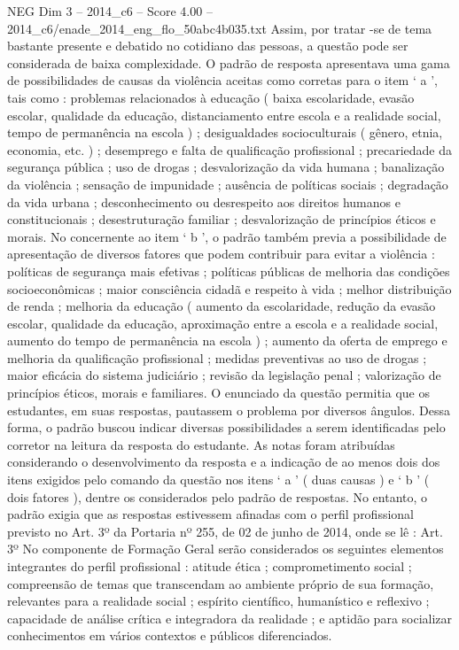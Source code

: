 \begin{textsample}{NEG Dim 3 – 2014\_c6 – Score 4.00 – 2014\_c6/enade\_2014\_eng\_flo\_50abc4b035.txt}
Assim, por tratar -se de tema bastante presente e debatido no cotidiano das pessoas, a questão pode ser considerada de baixa complexidade.
O padrão de resposta apresentava uma gama de possibilidades de causas da violência aceitas como corretas para o item ‘ a ’, tais como : problemas relacionados à educação ( baixa escolaridade, evasão escolar, qualidade da educação, distanciamento entre escola e a realidade social, tempo de permanência na escola ) ; desigualdades socioculturais ( gênero, etnia, economia, etc. ) ; desemprego e falta de qualificação profissional ; precariedade da segurança pública ; uso de drogas ; desvalorização da vida humana ; banalização da violência ; sensação de impunidade ; ausência de políticas sociais ; degradação da vida urbana ; desconhecimento ou desrespeito aos direitos humanos e constitucionais ; desestruturação familiar ; desvalorização de princípios éticos e morais.
No concernente ao item ‘ b ’, o padrão também previa a possibilidade de apresentação de diversos fatores que podem contribuir para evitar a violência : políticas de segurança mais efetivas ; políticas públicas de melhoria das condições socioeconômicas ; maior consciência cidadã e respeito à vida ; melhor distribuição de renda ; melhoria da educação ( aumento da escolaridade, redução da evasão escolar, qualidade da educação, aproximação entre a escola e a realidade social, aumento do tempo de permanência na escola ) ; aumento da oferta de emprego e melhoria da qualificação profissional ; medidas preventivas ao uso de drogas ; maior eficácia do sistema judiciário ; revisão da legislação penal ; valorização de princípios éticos, morais e familiares.
O enunciado da questão permitia que os estudantes, em suas respostas, pautassem o problema por diversos ângulos.
Dessa forma, o padrão buscou indicar diversas possibilidades a serem identificadas pelo corretor na leitura da resposta do estudante.
As notas foram atribuídas considerando o desenvolvimento da resposta e a indicação de ao menos dois dos itens exigidos pelo comando da questão nos itens ‘ a ’ ( duas causas ) e ‘ b ’ ( dois fatores ), dentre os considerados pelo padrão de respostas.
No entanto, o padrão exigia que as respostas estivessem afinadas com o perfil profissional previsto no Art. 3º da Portaria nº 255, de 02 de junho de 2014, onde se lê : Art. 3º No componente de Formação Geral serão considerados os seguintes elementos integrantes do perfil profissional : atitude ética ; comprometimento social ; compreensão de temas que transcendam ao ambiente próprio de sua formação, relevantes para a realidade social ; espírito científico, humanístico e reflexivo ; capacidade de análise crítica e integradora da realidade ; e aptidão para socializar conhecimentos em vários contextos e públicos diferenciados.

\end{textsample}
